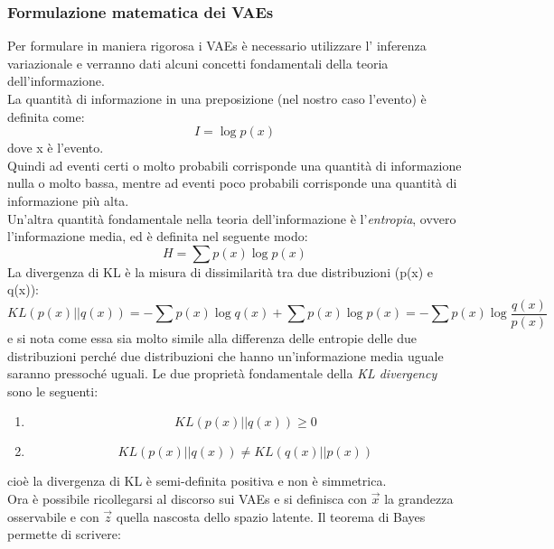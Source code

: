 \subsubsection{Formulazione matematica dei VAEs}
\label{matematica dei VAEs}

Per formulare in maniera rigorosa i VAEs è necessario utilizzare l' inferenza variazionale e verranno dati alcuni concetti fondamentali della teoria dell'informazione. \\
La quantità di informazione in una preposizione (nel nostro caso l'evento) è definita come:
\begin{equation}
	I = \log p(x)
\end{equation}
dove x è l'evento. \\
Quindi ad eventi certi o molto probabili corrisponde una quantità di informazione nulla o molto bassa, mentre ad eventi poco probabili corrisponde una quantità di informazione più alta. \\ 
Un'altra quantità fondamentale nella teoria dell'informazione è l'\textit{entropia}, ovvero l'informazione media, ed è definita nel seguente modo:
\begin{equation}
	H = \sum p(x) \log p(x)
\end{equation}
La divergenza di KL è la misura di dissimilarità tra due distribuzioni (p(x) e q(x)):
\begin{equation}
	KL(p(x)||q(x)) = -\sum p(x) \log q(x) + \sum p(x) \log p(x) = -\sum p(x) \log \frac{q(x)}{p(x)}
\end{equation}
e si nota come essa sia molto simile alla differenza delle entropie delle due distribuzioni perché due distribuzioni che hanno un'informazione media uguale saranno pressoché uguali.
Le due proprietà fondamentale della \textit{KL divergency} sono le seguenti:
\begin{enumerate}
	\item 
	\begin{equation}
		KL(p(x)||q(x)) \geq 0
	\end{equation}
	
	\item 
	\begin{equation}
		KL(p(x)||q(x)) \not = KL(q(x)||p(x))
	\end{equation}
\end{enumerate}
cioè la divergenza di KL è semi-definita positiva e non è simmetrica. \\
Ora è possibile ricollegarsi al discorso sui VAEs e si definisca con $\vec{x}$ la grandezza osservabile e con $\vec{z}$ quella nascosta dello spazio latente. Il teorema di Bayes \cite{Statistica} permette di scrivere:
